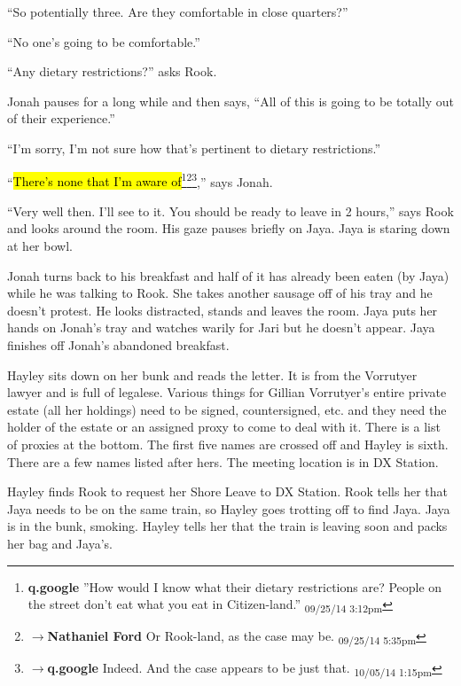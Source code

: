``So potentially three.  Are they comfortable in close quarters?''

``No one's going to be comfortable.''

``Any dietary restrictions?'' asks Rook.

Jonah pauses for a long while and then says, ``All of this is going to be totally out of their experience.''

``I'm sorry, I'm not sure how that's pertinent to dietary restrictions.''

``\hl{There's none that I'm aware of}\footnote{\textbf{q.google }''How would I know what their dietary restrictions are?  People on the street don't eat what you eat in Citizen-land.'' \textsubscript{09/25/14 3:12pm}}\footnote{$\rightarrow$\textbf{Nathaniel Ford }Or Rook-land, as the case may be. \textsubscript{09/25/14 5:35pm}}\footnote{$\rightarrow$\textbf{q.google }Indeed.  And the case appears to be just that. \textsubscript{10/05/14 1:15pm}},'' says Jonah.

``Very well then.  I'll see to it.  You should be ready to leave in 2 hours,'' says Rook and looks around the room.  His gaze pauses briefly on Jaya.  Jaya is staring down at her bowl.

Jonah turns back to his breakfast and half of it has already been eaten (by Jaya) while he was talking to Rook.  She takes another sausage off of his tray and he doesn't protest.  He looks distracted, stands and leaves the room.  Jaya puts her hands on Jonah's tray and watches warily for Jari but he doesn't appear.  Jaya finishes off Jonah's abandoned breakfast.



Hayley sits down on her bunk and reads the letter.  It is from the Vorrutyer lawyer and is full of legalese.  Various things for Gillian Vorrutyer's entire private estate (all her holdings) need to be signed, countersigned, etc. and they need the holder of the estate or an assigned proxy to come to deal with it.  There is a list of proxies at the bottom.  The first five names are crossed off and Hayley is sixth.  There are a few names listed after hers.  The meeting location is in DX Station.



Hayley finds Rook to request her Shore Leave to DX Station.  Rook tells her that Jaya needs to be on the same train, so Hayley goes trotting off to find Jaya.  Jaya is in the bunk, smoking.  Hayley tells her that the train is leaving soon and packs her bag and Jaya's.



